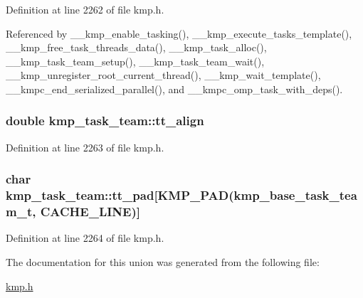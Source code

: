 Definition at line 2262 of file kmp.\-h.



Referenced by \-\_\-\-\_\-kmp\-\_\-enable\-\_\-tasking(), \-\_\-\-\_\-kmp\-\_\-execute\-\_\-tasks\-\_\-template(), \-\_\-\-\_\-kmp\-\_\-free\-\_\-task\-\_\-threads\-\_\-data(), \-\_\-\-\_\-kmp\-\_\-task\-\_\-alloc(), \-\_\-\-\_\-kmp\-\_\-task\-\_\-team\-\_\-setup(), \-\_\-\-\_\-kmp\-\_\-task\-\_\-team\-\_\-wait(), \-\_\-\-\_\-kmp\-\_\-unregister\-\_\-root\-\_\-current\-\_\-thread(), \-\_\-\-\_\-kmp\-\_\-wait\-\_\-template(), \-\_\-\-\_\-kmpc\-\_\-end\-\_\-serialized\-\_\-parallel(), and \-\_\-\-\_\-kmpc\-\_\-omp\-\_\-task\-\_\-with\-\_\-deps().

\hypertarget{unionkmp__task__team_a0acf8ce5539332e0a9c56d28e8361b65}{
\subsubsection[{tt\-\_\-align}]{\setlength{\rightskip}{0pt plus 5cm}double kmp\-\_\-task\-\_\-team\-::tt\-\_\-align}}\label{unionkmp__task__team_a0acf8ce5539332e0a9c56d28e8361b65}


Definition at line 2263 of file kmp.\-h.

\hypertarget{unionkmp__task__team_a030ee1dc84827a068fa846a15e745786}{
\subsubsection[{tt\-\_\-pad}]{\setlength{\rightskip}{0pt plus 5cm}char kmp\-\_\-task\-\_\-team\-::tt\-\_\-pad\mbox{[}{\bf K\-M\-P\-\_\-\-P\-A\-D}({\bf kmp\-\_\-base\-\_\-task\-\_\-team\-\_\-t}, {\bf C\-A\-C\-H\-E\-\_\-\-L\-I\-N\-E})\mbox{]}}}\label{unionkmp__task__team_a030ee1dc84827a068fa846a15e745786}


Definition at line 2264 of file kmp.\-h.



The documentation for this union was generated from the following file\-:\begin{DoxyCompactItemize}
\item 
\hyperlink{kmp_8h}{kmp.\-h}\end{DoxyCompactItemize}
